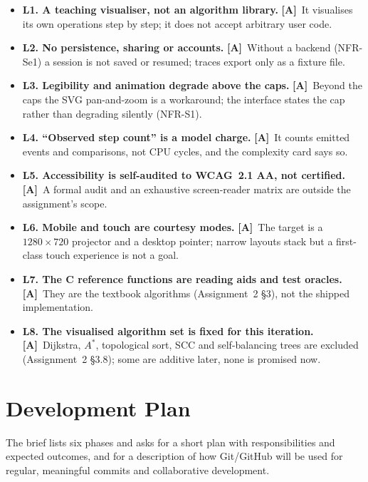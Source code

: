 \documentclass[11pt,a4paper]{article}
\newcommand{\A}{\textcolor{asmc}{\textbf{[A]}}}     %
\begin{document}
\begin{itemize}[leftmargin=1.4em,topsep=2pt,itemsep=1pt]
  \item \textbf{L1. A teaching visualiser, not an algorithm library.} \A\ It visualises its own
        operations step by step; it does not accept arbitrary user code.
  \item \textbf{L2. No persistence, sharing or accounts.} \A\ Without a backend (NFR-Se1) a
        session is not saved or resumed; traces export only as a fixture file.
  \item \textbf{L3. Legibility and animation degrade above the caps.} \A\ Beyond the caps the
        SVG pan-and-zoom is a workaround; the interface states the cap rather than degrading
        silently (NFR-S1).
  \item \textbf{L4. ``Observed step count'' is a model charge.} \A\ It counts emitted events and
        comparisons, not CPU cycles, and the complexity card says so.
  \item \textbf{L5. Accessibility is self-audited to WCAG~2.1 AA, not certified.} \A\ A formal
        audit and an exhaustive screen-reader matrix are outside the assignment's scope.
  \item \textbf{L6. Mobile and touch are courtesy modes.} \A\ The target is a
        $1280 \times 720$ projector and a desktop pointer; narrow layouts stack but a
        first-class touch experience is not a goal.
  \item \textbf{L7. The C reference functions are reading aids and test oracles.} \A\ They are
        the textbook algorithms (Assignment~2 \S3), not the shipped implementation.
  \item \textbf{L8. The visualised algorithm set is fixed for this iteration.} \A\ Dijkstra,
        $A^{*}$, topological sort, SCC and self-balancing trees are excluded (Assignment~2
        \S3.8); some are additive later, none is promised now.
\end{itemize}

\section{Development Plan}

The brief lists six phases and asks for a short plan with responsibilities and expected
outcomes, and for a description of how Git/GitHub will be used for regular, meaningful
commits and collaborative development.
\end{document}
